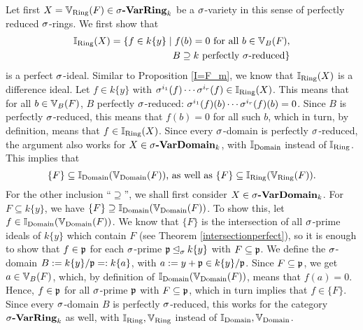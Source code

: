 \begin{prop}
\begin{bew}
Let first $X  = \mathbb{V}_{\operatorname{Ring}}(F) \in \sigma\text{{\normalfont\textbf{-VarRing}}}_k$ be a $\sigma$-variety in this sense of perfectly reduced $\sigma$-rings. 
We first show that \begin{align*} \mathbb{I}_{\operatorname{Ring}}(X) =  \{ f \in k\{y\} \mid f(b) = 0 \text{ for all } b \in \mathbb{V}_B(F), \\ B \supseteq k\text{ perfectly }\sigma\text{-reduced} \} \end{align*}
 is a perfect $\sigma$-ideal. Similar to Proposition \ref{I=F_m}, we know that $\mathbb{I}_{\operatorname{Ring}}(X)$ is a difference ideal. Let $f \in k\{y\}$ with $\sigma^{i_1}(f) \cdots \sigma^{i_r}(f) \in \mathbb{I}_{\operatorname{Ring}}(X)$. This means that for all $b \in \mathbb{V}_B(F)$,
 $B$ perfectly $\sigma$-reduced: $\sigma^{i_1}(f)(b) \cdots \sigma^{i_r}(f)(b) = 0$. Since $B$ is perfectly $\sigma$-reduced, this means that $f(b) = 0$ for all such $b$,
 which in turn, by definition, means that $f \in \mathbb{I}_{\operatorname{Ring}}(X)$. Since every $\sigma$-domain is perfectly $\sigma$-reduced, the argument also works for $X \in \sigma\text{{\normalfont\textbf{-VarDomain}}}_k$, with $\mathbb{I}_{\operatorname{Domain}}$ instead of $\mathbb{I}_{\operatorname{Ring}}$.
This implies that $$ \{ F \} \subseteq \mathbb{I}_{\operatorname{Domain}}(\mathbb{V}_{\operatorname{Domain}}(F))\text{, as well as } \{ F \} \subseteq \mathbb{I}_{\operatorname{Ring}}(\mathbb{V}_{\operatorname{Ring}}(F)).$$
For the other inclusion ``$\supseteq$'', we shall first consider $X \in \sigma\text{{\normalfont\textbf{-VarDomain}}}_k$.
For $F \subseteq k\{y\}$, we have $\{F\} \supseteq \mathbb{I}_{\operatorname{Domain}}(\mathbb{V}_{\operatorname{Domain}}(F))$. To show this, let \\ $f \in \mathbb{I}_{\operatorname{Domain}}(\mathbb{V}_{\operatorname{Domain}}(F))$.
We know that $\{F\}$ is the intersection of all $\sigma$-prime ideals of $k\{y\}$ which contain $F$ (see Theorem \ref{intersectionperfect}), so it is enough to show that $f \in \mathfrak{p}$ for each $\sigma$-prime $\mathfrak{p} \unlhd_{\sigma} k\{y\}$ with $F \subseteq \mathfrak{p}$.
We define the $\sigma$-domain $B:= k\{y\}/\mathfrak{p} =: k\{a\}$, with $a := y + \mathfrak{p} \in k\{y\}/\mathfrak{p}$. Since $F \subseteq \mathfrak{p}$, we get $a \in \mathbb{V}_B(F)$, which, by definition of $\mathbb{I}_{\operatorname{Domain}}(\mathbb{V}_{\operatorname{Domain}}(F))$, means that $f(a) = 0$. Hence, $f \in \mathfrak{p}$ for all $\sigma$-prime $\mathfrak{p}$
with $F \subseteq \mathfrak{p}$, which in turn implies that $f \in \{F\}$. Since every $\sigma$-domain $B$ is perfectly $\sigma$-reduced, this works for the category $\sigma\text{{\normalfont\textbf{-VarRing}}}_k$ as well, with $\mathbb{I}_{\operatorname{Ring}}, \mathbb{V}_{\operatorname{Ring}}$ instead of $\mathbb{I}_{\operatorname{Domain}}, \mathbb{V}_{\operatorname{Domain}}$.
\end{bew}

\end{prop}

